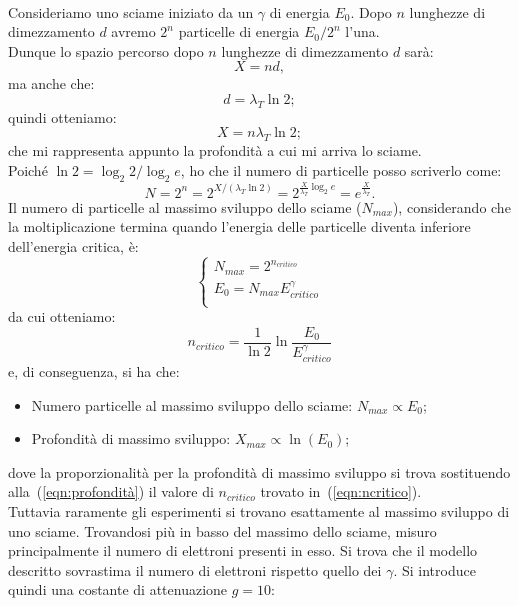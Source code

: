 \documentclass[10pt,a4paper,usenatbib]{article}
\begin{document}
\\Consideriamo uno sciame iniziato da un  $\gamma$ di energia $E_0$. Dopo $n$ lunghezze di dimezzamento $d$ avremo $2^n$ particelle di energia $E_0/2^n$ l'una. 
\\Dunque lo spazio percorso dopo $n$ lunghezze di dimezzamento $d$ sarà: 
\begin{equation}
X = n d, 
\end{equation}
ma anche che:
\begin{equation}
 d = \lambda_T \ln{2}; 
\end{equation}
quindi otteniamo: 
\begin{equation}
 X = n \lambda_T \ln{2}; 
\label{eqn:profondità}
\end{equation}
che mi rappresenta appunto la profondità a cui mi arriva lo sciame. 
\\Poiché $\ln2 = \log_2{2}/\log_2{e}$, ho che il numero di particelle posso scriverlo come: 
\begin{equation}
 N = 2^n = 2^{X/(\lambda_T \ln2)} =  2^{\frac{X}{\lambda_T} \log_2{e}} = e^{\frac{X}{\lambda_T}}. 
\end{equation}
Il numero di particelle al massimo sviluppo dello sciame ($N_{max}$), considerando che la moltiplicazione termina quando l'energia delle particelle diventa inferiore dell'energia critica, è: 
\begin{equation}
\begin{cases}
N_{max} = 2^{n_{critico}} \\
E_0 = N_{max} E_{critico}^\gamma \\
\end{cases}
\end{equation}
da cui otteniamo: 
\begin{equation}
n_{critico} = \frac{1}{\ln2} \ln{\frac{E_0}{E_{critico}^\gamma}} 
\label{eqn:ncritico}
\end{equation}
e, di conseguenza, si ha che: 
\begin{itemize} 
\item Numero particelle al massimo sviluppo dello sciame: $N_{max} \propto E_0$; 
\item  Profondità di massimo sviluppo: $X_{max} \propto \ln(E_0)$; 
\end{itemize}
dove la proporzionalità per la profondità di massimo sviluppo si trova sostituendo alla~(\ref{eqn:profondità}) il valore di $n_{critico}$ trovato in~(\ref{eqn:ncritico}). 
\\Tuttavia raramente gli esperimenti si trovano esattamente al massimo sviluppo di uno sciame. Trovandosi più in basso del massimo dello sciame, misuro principalmente il numero di elettroni presenti in esso. Si trova che il modello descritto sovrastima il numero di elettroni rispetto quello dei $\gamma$. Si introduce quindi una costante di attenuazione $g=10$: 
\end{document}
